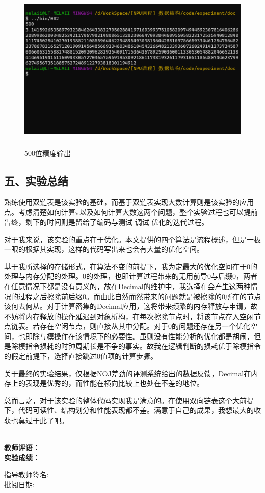 \documentclass[UTF8, a4paper]{ctexart}
\begin{document}
\begin{figure}[H]
	\begin{minipage}[t]{\linewidth}
		\centering
		\includegraphics[width=125mm,height=80mm]{./assets/DS02-4}
		\caption{500位精度输出}
	\end{minipage}
\end{figure}

\subsection*{五、实验总结}
熟练使用双链表是该实验的基础，而基于双链表实现大数计算则是该实验的应用点。考虑清楚如何计算$\pi$以及如何计算大数这两个问题，整个实验过程也可以提前告终，剩下的时间则是留给了编码与测试-调试-优化的迭代过程。 \par
对于我来说，该实验的重点在于优化。本文提供的四个算法是流程概述，但是一板一眼的根据其实现，这样的代码写出来也会有大量的优化空间。 \par
基于我所选择的存储形式，在算法不变的前提下，我为定最大的优化空间在于0的处理与内存分配的处理。0的处理，也即计算过程带来的无用前导0与后缀0，两者在任意情况下都是没有意义的，故在Decimal的维护中，我选择在会产生这两种情况的过程之后擦除前后缀0。而由此自然而然带来的问题就是被擦除的0所在的节点该何去何从。对于计算密集的Decimal应用，这将带来频繁的内存释放与申请，故不妨将内存释放的操作延迟到对象析构，在每次擦除节点时，将该节点存入空闲节点链表。若存在空闲节点，则直接从其中分配。对于0的问题还存在另一个优化空间，也即除与模操作在该情境下的必要性。虽则没有性能分析的优化都是胡闹，但是除模指令损耗的时钟周期长是不争的事实。故我在逻辑判断的损耗优于除模指令的假定前提下，选择直接跳过0值项的计算步骤。 \par
关于最终的实验结果，仅根据NOJ差劲的评测系统给出的数据反馈，Decimal在内存上的表现是优秀的，而性能在横向比较上也处在不差的地位。 \par
总而言之，对于该实验的整体代码实现我是满意的。在使用双向链表这个大前提下，代码可读性、结构划分和性能表现都不差。满意于自己的成果，我想最大的收获也莫过于此了吧。

~\\
\textbf{教师评语：}
~\\
\textbf{实验成绩：}

\begin{flushright}
\mbox{指导教师签名:\qquad\qquad} \\
\mbox{批阅日期:\qquad\qquad}
\end{flushright}
\end{document}
